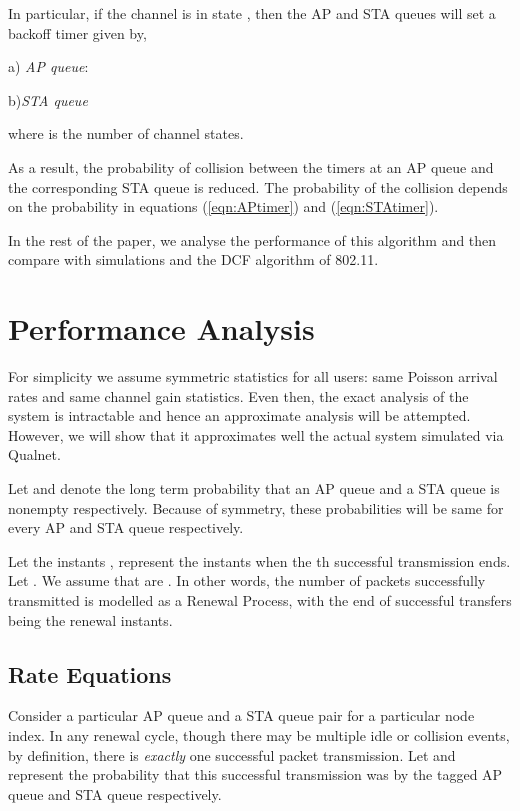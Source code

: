 \documentclass[10pt,conference]{IEEEtran}
\begin{document}
 In particular, if the channel is in state , then the AP and STA queues will set a backoff timer   given by,

a) \emph{AP queue}:



b)\emph{STA queue}

where  is the number of channel states. 


As a result, the probability of collision between the timers at an AP queue and the corresponding STA queue is reduced.
The probability of the collision depends on the probability  in equations (\ref{eqn:APtimer}) and (\ref{eqn:STAtimer}).

In the rest of the paper, we analyse the performance of this algorithm and then compare with simulations and the DCF algorithm of 802.11.

\section{Performance Analysis}
For simplicity we assume symmetric statistics for all users: same Poisson arrival rates and same channel gain statistics.
Even then, the exact analysis of the system is intractable and hence an approximate analysis will be attempted.
However, we will show that it approximates well the actual system simulated via Qualnet.

Let  and  denote the long term probability that an AP queue and a STA queue is nonempty respectively. Because of symmetry, these probabilities will be same for every AP and STA queue respectively.

Let the instants ,  represent the instants when the th successful transmission ends. Let  .
We assume that  are .
In other words, the number of packets successfully transmitted is modelled as a Renewal Process, with
the end of successful transfers being the renewal instants.

\subsection{Rate Equations}
\label{sec:fixedpoint}

Consider a particular AP queue and a STA queue pair for a particular node index. In any renewal cycle, though there may be multiple idle or collision events, by definition, there is \emph{exactly} one successful packet transmission. 
Let  and  represent the probability that this successful transmission was by the tagged AP queue and STA queue respectively.
\end{document}
